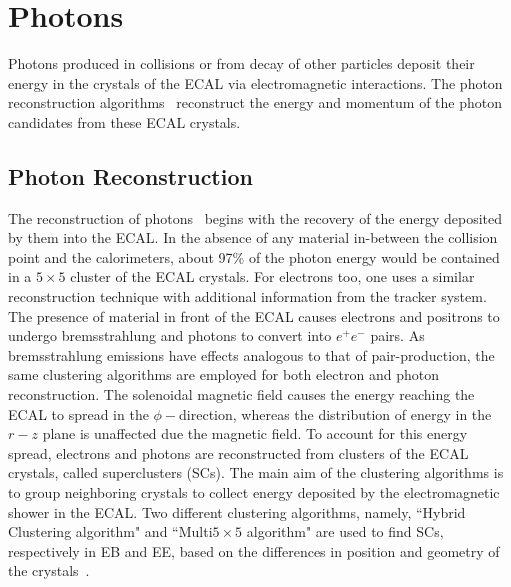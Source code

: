 \section{Photons}\label{Se:photonReco}
Photons produced in \pp collisions or from decay of other particles deposit their energy in the crystals of the ECAL via electromagnetic interactions. 
The photon reconstruction algorithms~\cite{Khachatryan:2015iwa} reconstruct the energy and momentum of the photon candidates from these ECAL crystals. 

\subsection{Photon Reconstruction}
The reconstruction of photons~\cite{Khachatryan:2015iwa} begins with the recovery of the energy deposited by them into the ECAL. In the absence of any 
material in-between the collision point and the calorimeters, about 97\% of the photon energy would be contained in a $5\times5$ cluster of the ECAL 
crystals. For electrons too, one uses a similar reconstruction technique with additional information from the tracker system. The presence of material 
in front of the ECAL causes electrons and positrons to undergo bremsstrahlung and photons to convert into $e^{+}e^{-}$ pairs. As bremsstrahlung 
emissions have effects analogous to that of pair-production, the same clustering algorithms are employed for both electron and photon reconstruction. 
The solenoidal magnetic field causes the energy reaching the ECAL to spread in the $\phi-$direction, whereas the distribution of energy in the $r-z$ 
plane is unaffected due the magnetic field. To account for this energy spread, electrons and photons are reconstructed from clusters of the ECAL 
crystals, called superclusters (\gls{SCs}). The main aim of the clustering algorithms is to group neighboring crystals to collect energy deposited 
by the electromagnetic shower in the ECAL. Two different clustering algorithms, namely, ``Hybrid Clustering algorithm" and ``Multi$5\times5$ algorithm" 
are used to find SCs, respectively in EB and EE, based on the differences in position and geometry of the 
crystals~\cite{Khachatryan:2015iwa,Khachatryan:2015hwa,Anderson:1365024}.

